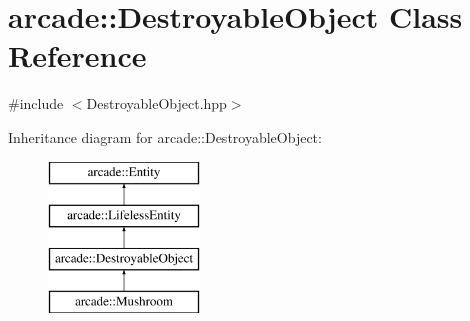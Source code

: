 \hypertarget{classarcade_1_1_destroyable_object}{\section{arcade\-:\-:Destroyable\-Object Class Reference}
\label{classarcade_1_1_destroyable_object}
}


{\ttfamily \#include $<$Destroyable\-Object.\-hpp$>$}

Inheritance diagram for arcade\-:\-:Destroyable\-Object\-:\begin{figure}[H]
\begin{center}
\leavevmode
\includegraphics[height=4.000000cm]{classarcade_1_1_destroyable_object}
\end{center}
\end{figure}
